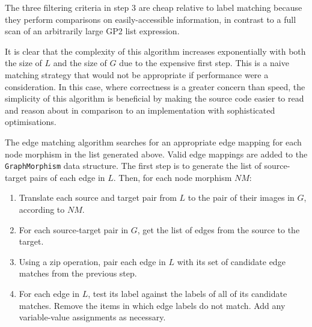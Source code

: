 The three filtering criteria in step 3 are cheap relative to label matching because they perform comparisons on easily-accessible information, in contrast to a full scan of an arbitrarily large GP2 list expression.

It is clear that the complexity of this algorithm increases exponentially with both the size of $L$ and the size of $G$ due to the expensive first step. This is a naive matching strategy that would not be appropriate if performance were a consideration. In this case, where correctness is a greater concern than speed, the simplicity of this algorithm is beneficial by making the source code easier to read and reason about in comparison to an implementation with sophisticated optimisations.

The edge matching algorithm searches for an appropriate edge mapping for each node morphism in the list generated above. Valid edge mappings are added to the \texttt{GraphMorphism} data structure. The first step is to generate the list of source-target pairs of each edge in $L$. Then, for each node morphism $NM$:

\begin{enumerate}
\item Translate each source and target pair from $L$ to the pair of their images in $G$, according to $NM$.
\item For each source-target pair in $G$, get the list of edges from the source to the target.
\item Using a zip operation, pair each edge in $L$ with its set of candidate edge matches from the previous step.
\item For each edge in $L$, test its label against the labels of all of its candidate matches. Remove the items in which edge labels do not match. Add any variable-value assignments as necessary.
\end{enumerate}

